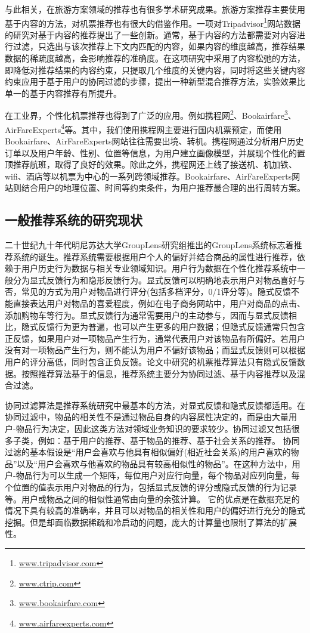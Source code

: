 与此相关，在旅游方案领域的推荐也有很多学术研究成果。旅游方案推荐主要使用基于内容的方法，对机票推荐也有很大的借鉴作用。一项对Tripadvisor\footnote{\url{www.tripadvisor.com}}网站数据的研究对基于内容的推荐提出了一些创新。通常，基于内容的方法都需要对内容进行过滤，只选出与该次推荐上下文内匹配的内容，如果内容的维度越高，推荐结果数据的稀疏度越高，会影响推荐的准确度。在这项研究中采用了内容松弛的方法，即降低对推荐结果的内容约束，只提取几个维度的关键内容，同时将这些关键内容约束应用于基于用户的协同过滤的步骤，提出一种新型混合推荐方法，实验效果比单一的基于内容推荐有所提升。

在工业界，个性化机票推荐也得到了广泛的应用。例如携程网\footnote{\url{www.ctrip.com}}、Bookairfare\footnote{\url{www.bookairfare.com}}、AirFareExperts\footnote{\url{www.airfareexperts.com}}等。其中，我们使用携程网主要进行国内机票预定，而使用Bookairfare、AirFareExperts网站往往需要出境、转机。携程网通过分析用户历史订单以及用户年龄、性别、位置等信息，为用户建立画像模型，并展现个性化的置顶推荐航班，取得了良好的效果。除此之外，携程网还上线了接送机、机加铁、wifi、酒店等以机票为中心的一系列跨领域推荐。Bookairfare、AirFareExperts网站则结合用户的地理位置、时间等约束条件，为用户推荐最合理的出行周转方案。

\subsection{一般推荐系统的研究现状}

二十世纪九十年代明尼苏达大学GroupLens研究组推出的GroupLens系统标志着推荐系统的诞生。推荐系统需要根据用户个人的偏好并结合商品的属性进行推荐，依赖于用户历史行为数据与相关专业领域知识。用户行为数据在个性化推荐系统中一般分为显式反馈行为和隐形反馈行为。显式反馈可以明确地表示用户对物品喜好与否，常见的方式为用户对物品进行评分(包括多档评分，0/1评分等)。隐式反馈不能直接表达用户对物品的喜爱程度，例如在电子商务网站中，用户对商品的点击、添加购物车等行为。显式反馈行为通常需要用户的主动参与，因而与显式反馈相比，隐式反馈行为更为普遍，也可以产生更多的用户数据；但隐式反馈通常只包含正反馈，如果用户对一项物品产生行为，通常代表用户对该物品有所偏好。若用户没有对一项物品产生行为，则不能认为用户不偏好该物品；而显式反馈则可以根据用户的评分高低，同时包含正负反馈。论文中研究的机票推荐算法只有隐式反馈数据。按照推荐算法基于的信息，推荐系统主要分为协同过滤、基于内容推荐以及混合过滤。
		
协同过滤算法是推荐系统研究中最基本的方法，对显式反馈和隐式反馈都适用。在协同过滤中，物品的相关性不是通过物品自身的内容属性决定的，而是由大量用户-物品行为决定，因此这类方法对领域业务知识的要求较少。协同过滤又包括很多子类，例如：基于用户的推荐、基于物品的推荐、基于社会关系的推荐。
协同过滤的基本假设是“用户会喜欢与他具有相似偏好(相近社会关系)的用户喜欢的物品”以及“用户会喜欢与他喜欢的物品具有较高相似性的物品”。在这种方法中，用户-物品行为可以生成一个矩阵，每位用户对应行向量，每个物品对应列向量，每个位置的值表示用户对物品的行为，包括显式反馈的评分或隐式反馈的行为记录等。用户或物品之间的相似性通常由向量的余弦计算。
它的优点是在数据充足的情况下具有较高的准确率，并且可以对物品的相关性和用户的偏好进行充分的隐式挖掘。但是却面临数据稀疏和冷启动的问题，庞大的计算量也限制了算法的扩展性。
		
